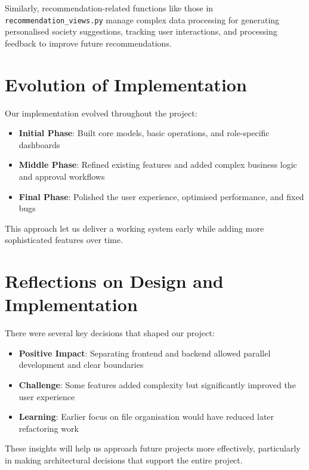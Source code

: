 Similarly, recommendation-related functions like those in \texttt{recommendation\_views.py} manage complex data processing for generating personalised society suggestions, tracking user interactions, and processing feedback to improve future recommendations.

\section{Evolution of Implementation}

Our implementation evolved throughout the project:

\begin{itemize}
    \item \textbf{Initial Phase}: Built core models, basic operations, and role-specific dashboards
    \item \textbf{Middle Phase}: Refined existing features and added complex business logic and approval workflows
    \item \textbf{Final Phase}: Polished the user experience, optimised performance, and fixed bugs
\end{itemize}

This approach let us deliver a working system early while adding more sophisticated features over time.

\section{Reflections on Design and Implementation}

There were several key decisions that shaped our project:

\begin{itemize}
    \item \textbf{Positive Impact}: Separating frontend and backend allowed parallel development and clear boundaries
    \item \textbf{Challenge}: Some features added complexity but significantly improved the user experience
    \item \textbf{Learning}: Earlier focus on file organisation would have reduced later refactoring work
\end{itemize}

These insights will help us approach future projects more effectively, particularly in making architectural decisions that support the entire project.